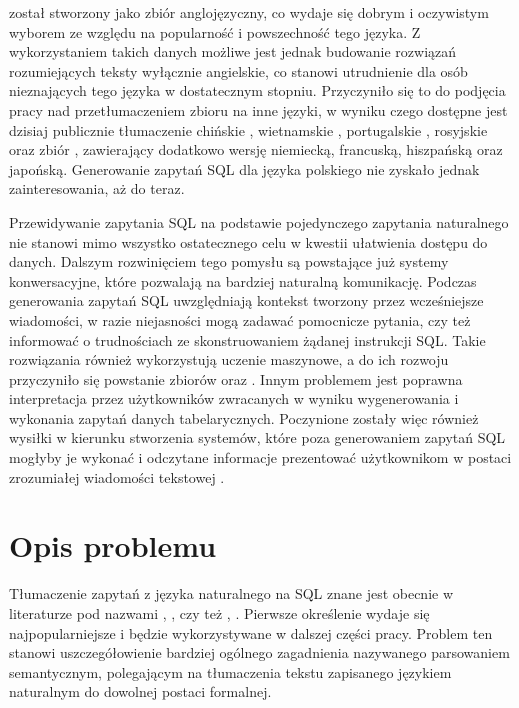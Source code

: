  został stworzony jako zbiór anglojęzyczny, co wydaje się dobrym i oczywistym wyborem ze względu na popularność i powszechność tego języka. Z wykorzystaniem takich danych możliwe jest jednak budowanie rozwiązań rozumiejących teksty wyłącznie angielskie, co stanowi utrudnienie dla osób nieznających tego języka w dostatecznym stopniu. Przyczyniło się to do podjęcia pracy nad przetłumaczeniem zbioru  na inne języki, w wyniku czego dostępne jest dzisiaj publicznie tłumaczenie chińskie , wietnamskie , portugalskie , rosyjskie  oraz zbiór  , zawierający dodatkowo wersję niemiecką, francuską, hiszpańską oraz japońską. Generowanie zapytań SQL dla języka polskiego nie zyskało jednak zainteresowania, aż do teraz.

Przewidywanie zapytania SQL na podstawie pojedynczego zapytania naturalnego nie stanowi mimo wszystko ostatecznego celu w kwestii ułatwienia dostępu do danych. Dalszym rozwinięciem tego pomysłu są powstające już systemy konwersacyjne, które pozwalają na bardziej naturalną komunikację. Podczas generowania zapytań SQL uwzględniają kontekst tworzony przez wcześniejsze wiadomości, w razie niejasności mogą zadawać pomocnicze pytania, czy też informować o trudnościach ze skonstruowaniem żądanej instrukcji SQL. Takie rozwiązania również wykorzystują uczenie maszynowe, a do ich rozwoju przyczyniło się powstanie zbiorów   oraz  . Innym problemem jest poprawna interpretacja przez użytkowników zwracanych w wyniku wygenerowania i wykonania zapytań danych tabelarycznych. Poczynione zostały więc również wysiłki w kierunku stworzenia systemów, które poza generowaniem zapytań SQL mogłyby je wykonać i odczytane informacje prezentować użytkownikom w postaci zrozumiałej wiadomości tekstowej .

\section{Opis problemu}
Tłumaczenie zapytań z języka naturalnego na SQL znane jest obecnie w literaturze pod nazwami , , czy też , . Pierwsze określenie wydaje się najpopularniejsze i będzie wykorzystywane w dalszej części pracy. Problem ten stanowi uszczegółowienie bardziej ogólnego zagadnienia nazywanego parsowaniem semantycznym, polegającym na tłumaczenia tekstu zapisanego językiem naturalnym do dowolnej postaci formalnej.

